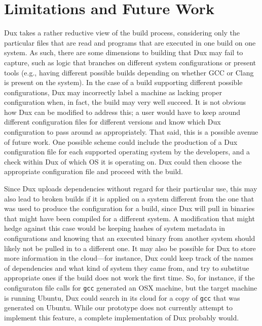 \documentclass[10pt,conference]{IEEEtran}
\begin{document}
\section{Limitations and Future Work}

Dux takes a rather reductive view of the build process, considering only the particular files that are read
and programs that are executed in one build on one system. As such, there are some dimensions to building that
Dux may fail to capture, such as logic that branches on different system configurations or present tools (e.g.,
having different possible builds depending on whether GCC or Clang is present on the system). In the case of
a build supporting different possible configurations, Dux may incorrectly label a machine as lacking proper
configuration when, in fact, the build may very well succeed. It is not obvious how Dux can be modified to address
this; a user would have to keep around different configuration files for different versions and know which
Dux configuration to pass around as appropriately. That said, this is a possible avenue of future work. One possible
scheme could include the production of a Dux configuration file for each supported operating system by the
developers, and a check within Dux of which OS it is operating on. Dux could then choose the appropriate
configuration file and proceed with the build.

Since Dux uploads dependencies without regard for their particular use, this may also lead to broken builds 
if it is applied on a system different from the one that was used to produce the configuration for a build, 
since Dux will pull in binaries that might have been compiled for a different system. A modification that
might hedge against this case would be keeping hashes of system metadata in configurations and knowing
that an executed binary from another system should likely not be pulled in to a different one. It may also
be possible for Dux to store more information in the cloud---for instance, Dux could keep track of the names
of dependencies and what kind of system they came from, and try to substitue appropriate ones if the build does
not work the first time. So, for instance, if the configuraton file calls for \texttt{gcc} generated an OSX machine,
but the target machine is running Ubuntu, Dux could search in its cloud for a copy of \texttt{gcc} that was
generated on Ubuntu. While our prototype does not currently attempt to implement this feature, a complete
implementation of Dux probably would.
\end{document}

